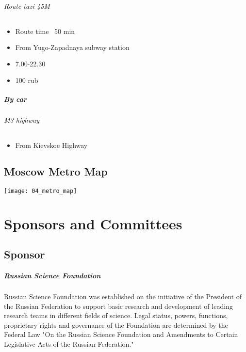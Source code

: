 \documentclass[10pt,fleqn,openany]{book} %
\begin{document}
\subparagraph{Route taxi 45M}
\begin{itemize}
	\item Route time ~50 min
	\item From Yugo-Zapadnaya subway station
	\item 7.00-22.30
	\item 100 rub
\end{itemize}

\paragraph{By car}
\subparagraph{M3 highway}
\begin{itemize}
	\item From Kievskoe Highway
\end{itemize}

\section{Moscow Metro Map}
\vspace{20pt}
\texttt{[image: 04\_metro\_map]}




\chapter{Sponsors and Committees}

\section{Sponsor}
\paragraph{Russian Science Foundation}
Russian Science Foundation was established on the initiative of the President of the Russian Federation to support basic research and development of leading research teams in different fields of science. Legal status, powers, functions, proprietary rights and governance of the Foundation are determined by the Federal Law "On the Russian Science Foundation and Amendments to Certain Legislative Acts of the Russian Federation."
\end{document}
